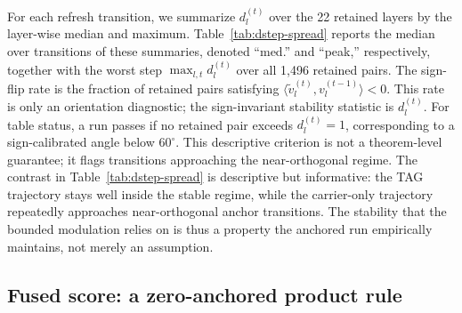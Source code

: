 For each refresh transition, we summarize \(d_l^{(t)}\) over the
22 retained layers by the layer-wise median and maximum.
Table~\ref{tab:dstep-spread} reports the median over transitions of
these summaries, denoted ``med.'' and ``peak,'' respectively, together
with the worst step \(\max_{l,t}d_l^{(t)}\) over all 1,496 retained
pairs. The sign-flip rate is the fraction of retained pairs satisfying
\(\langle \tilde v_l^{(t)}, v_l^{(t-1)} \rangle < 0\). This rate is
only an orientation diagnostic; the sign-invariant stability statistic
is \(d_l^{(t)}\). For table status, a run passes if no retained pair
exceeds \(d_l^{(t)}=1\), corresponding to a sign-calibrated angle below
\(60^\circ\). This descriptive criterion is not a theorem-level
guarantee; it flags transitions approaching the near-orthogonal regime.
The contrast in Table~\ref{tab:dstep-spread} is descriptive but
informative: the \textsc{TAG} trajectory stays well inside the stable
regime, while the carrier-only trajectory repeatedly approaches
near-orthogonal anchor transitions. The stability that the bounded
modulation relies on is thus a property the anchored run empirically
maintains, not merely an assumption.


\subsection{Fused score: a zero-anchored product rule}
\label{sec:tag-score}

